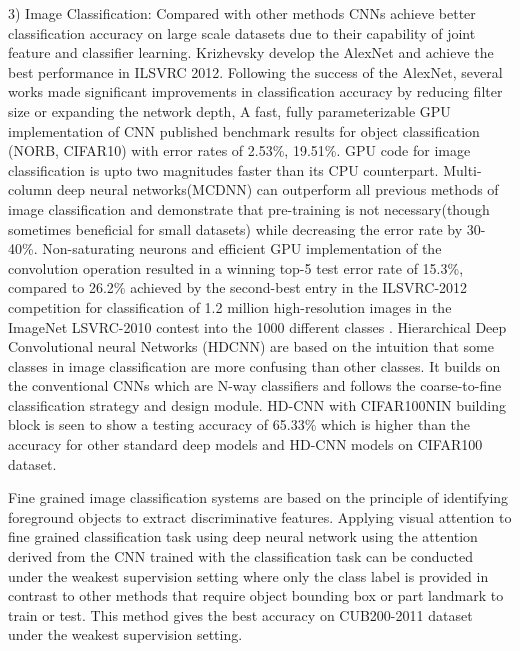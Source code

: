 \documentclass[12pt]{article}
\begin{document}
3) Image Classification: Compared with other methods
CNNs achieve better classification accuracy on large scale
datasets due to their capability of joint feature and classifier
learning. Krizhevsky  develop the AlexNet
and achieve the best performance in ILSVRC 2012.
Following the success of the AlexNet, several works made
significant improvements in classification accuracy by
reducing filter size or expanding the network depth,
A fast, fully parameterizable GPU implementation of
CNN published benchmark results for object classification
(NORB, CIFAR10) with error rates of 2.53\%, 19.51\%. GPU code for image classification is upto two magnitudes
faster than its CPU counterpart. Multi-column
deep neural networks(MCDNN) can outperform all
previous methods of image classification and demonstrate
that pre-training is not necessary(though sometimes
beneficial for small datasets) while decreasing the error rate
by 30-40\%. Non-saturating neurons and efficient GPU
implementation of the convolution operation resulted in a
winning top-5 test error rate of 15.3\%, compared to 26.2\%
achieved by the second-best entry in the ILSVRC-2012
competition for classification of 1.2 million high-resolution
images in the ImageNet LSVRC-2010 contest into the 1000
different classes .
Hierarchical Deep Convolutional neural Networks (HDCNN) are based on the intuition that some classes in image
classification are more confusing than other classes. It
builds on the conventional CNNs which are N-way
classifiers and follows the coarse-to-fine classification
strategy and design module. HD-CNN with CIFAR100NIN building block is seen to show a testing accuracy of
65.33\% which is higher than the accuracy for other standard
deep models and HD-CNN models on CIFAR100 dataset.

Fine grained image classification systems are based on
the principle of identifying foreground objects to extract
discriminative features. Applying visual attention to fine
grained classification task using deep neural network using
the attention derived from the CNN trained with the
classification task can be conducted under the weakest
supervision setting where only the class label is provided in contrast to other methods that require object bounding box
or part landmark to train or test. This method gives the best
accuracy on CUB200-2011 dataset under the weakest
supervision setting.
\end{document}
